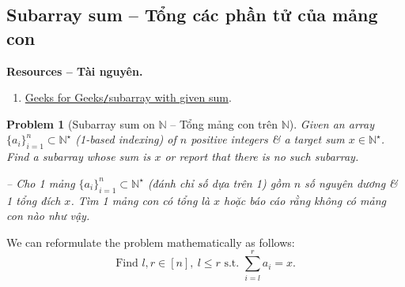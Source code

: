 \documentclass{article}
\newtheorem{problem}{Problem}
\begin{document}
\subsection{Subarray sum -- Tổng các phần tử của mảng con}


\textbf{\textsf{Resources -- Tài nguyên.}}
\begin{enumerate}
    \item \href{https://www.geeksforgeeks.org/dsa/find-subarray-with-given-sum/}{Geeks for Geeks{\tt/}subarray with given sum}.
\end{enumerate}

\begin{problem}[Subarray sum on $\mathbb{N}$ -- Tổng mảng con trên $\mathbb{N}$]
    Given an array $\{a_i\}_{i=1}^n\subset\mathbb{N}^\star$ (1-based indexing) of $n$ positive integers \& a target sum $x\in\mathbb{N}^\star$. Find a subarray whose sum is $x$ or report that there is no such subarray.

    -- Cho 1 mảng $\{a_i\}_{i=1}^n\subset\mathbb{N}^\star$ (đánh chỉ số dựa trên 1) gồm $n$ số nguyên dương \& 1 tổng đích $x$. Tìm 1 mảng con có tổng là $x$ hoặc báo cáo rằng không có mảng con nào như vậy.
\end{problem}
We can reformulate the problem mathematically as follows:
\begin{equation*}
    \mbox{Find } l,r\in[n],\ l\le r\mbox{ s.t. }\sum_{i=l}^r a_i = x.
\end{equation*}
\end{document}
